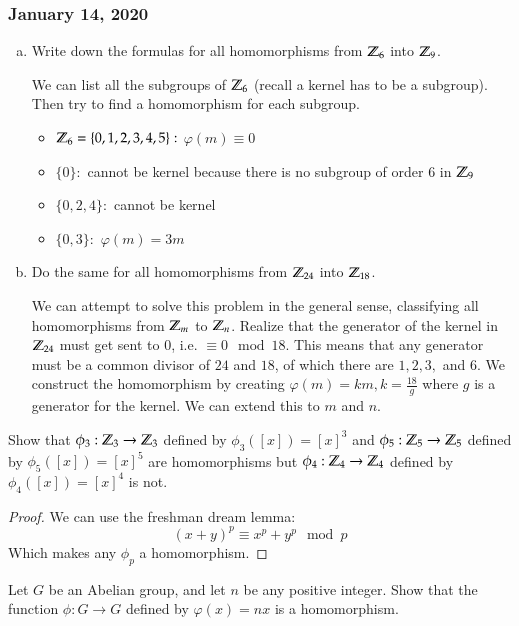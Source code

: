 \subsubsection*{January 14, 2020}

\exercise

\begin{enumerate}[(a)]
	\item Write down the formulas for all homomorphisms from $\mathbb{Z}_6$ into $\mathbb{Z}_9$. 
	
	We can list all the subgroups of $\mathbb{Z}_6$ (recall a kernel has to be a subgroup). Then try to find a homomorphism for each subgroup. 
	
	\begin{itemize}
		\item $\mathbb{Z}_6=\{0,1,2,3,4,5\}:$ $\varphi(m)\equiv 0$
		\item $\{0\}:$ cannot be kernel because there is no subgroup of order $6$ in $\mathbb{Z}_9$
		\item $\{0,2,4\}:$ cannot be kernel
		\item $\{0,3\}:$  $\varphi(m)=3m$
	\end{itemize}

	\item Do the same for all homomorphisms from $\mathbb{Z}_{24}$ into $\mathbb{Z}_{18}$. 
	
	We can attempt to solve this problem in the general sense, classifying all homomorphisms from $\mathbb{Z}_m$ to $\mathbb{Z}_n$. Realize that the generator of the kernel in $\mathbb{Z}_{24}$ must get sent to $0$, i.e. $\equiv 0\mod 18$. This means that any generator must be a common divisor of $24$ and $18$, of which there are $1, 2, 3, $ and $6$. We construct the homomorphism by creating $\varphi(m)=km, k=\frac{18}{g}$ where $g$ is a generator for the kernel. We can extend this to $m$ and $n$. 
\end{enumerate}

\exercise Show that $\phi_3: \mathbb{Z}_3\to \mathbb{Z}_3$ defined by $\phi_3([x])=[x]^3$ and $\phi_5: \mathbb{Z}_5\to \mathbb{Z}_5$ defined by $\phi_5([x])=[x]^5$ are homomorphisms but $\phi_4: \mathbb{Z}_4\to \mathbb{Z}_4$ defined by $\phi_4([x])=[x]^4$ is not. 

\begin{proof}
	We can use the freshman dream lemma: 
	\[(x+y)^p \equiv x^p + y^p\mod p\]
	Which makes any $\phi_p$ a homomorphism. 
\end{proof}

\exercise Let $G$ be an Abelian group, and let $n$ be any positive integer. Show that the function $\phi:G\to G$ defined by $\varphi(x)=nx$ is a homomorphism. 

